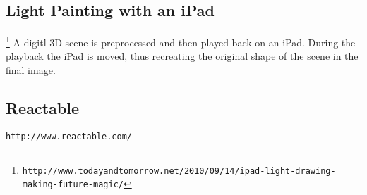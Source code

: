 \documentclass[10pt,a4paper]{scrartcl}
\begin{document}
\subsection{Light Painting with an iPad}
\footnote{\texttt{http://www.todayandtomorrow.net/2010/09/14/ipad-light-drawing-making-future-magic/}} A digitl 3D scene is preprocessed and then played back on an iPad. During the playback the iPad is moved, thus recreating the original shape of the scene in the final image.

\subsection{Reactable}
\texttt{http://www.reactable.com/}
\end{document}
